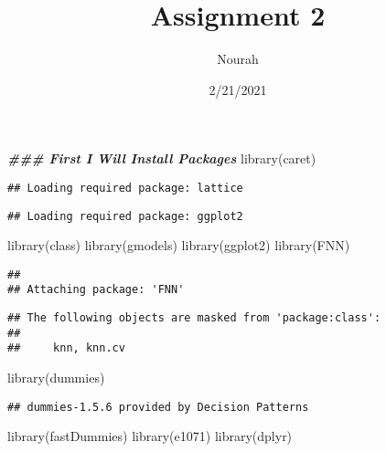 \documentclass[
]{article}
\title{Assignment 2}
\author{Nourah}
\date{2/21/2021}
\newenvironment{Shaded}{\begin{snugshade}}{\end{snugshade}}
\newcommand{\DocumentationTok}[1]{\textcolor[rgb]{0.56,0.35,0.01}{\textbf{\textit{#1}}}}
\newcommand{\FunctionTok}[1]{\textcolor[rgb]{0.00,0.00,0.00}{#1}}
\newcommand{\NormalTok}[1]{#1}
\begin{document}
\maketitle

\begin{Shaded}
\begin{Highlighting}[]
\DocumentationTok{\#\#\# First I Will Install Packages}
\FunctionTok{library}\NormalTok{(caret)}
\end{Highlighting}
\end{Shaded}

\begin{verbatim}
## Loading required package: lattice
\end{verbatim}

\begin{verbatim}
## Loading required package: ggplot2
\end{verbatim}

\begin{Shaded}
\begin{Highlighting}[]
\FunctionTok{library}\NormalTok{(class)}
\FunctionTok{library}\NormalTok{(gmodels)}
\FunctionTok{library}\NormalTok{(ggplot2)}
\FunctionTok{library}\NormalTok{(FNN)}
\end{Highlighting}
\end{Shaded}

\begin{verbatim}
## 
## Attaching package: 'FNN'
\end{verbatim}

\begin{verbatim}
## The following objects are masked from 'package:class':
## 
##     knn, knn.cv
\end{verbatim}

\begin{Shaded}
\begin{Highlighting}[]
\FunctionTok{library}\NormalTok{(dummies)}
\end{Highlighting}
\end{Shaded}

\begin{verbatim}
## dummies-1.5.6 provided by Decision Patterns
\end{verbatim}

\begin{Shaded}
\begin{Highlighting}[]
\FunctionTok{library}\NormalTok{(fastDummies)}
\FunctionTok{library}\NormalTok{(e1071)}
\FunctionTok{library}\NormalTok{(dplyr)}
\end{Highlighting}
\end{Shaded}
\end{document}
